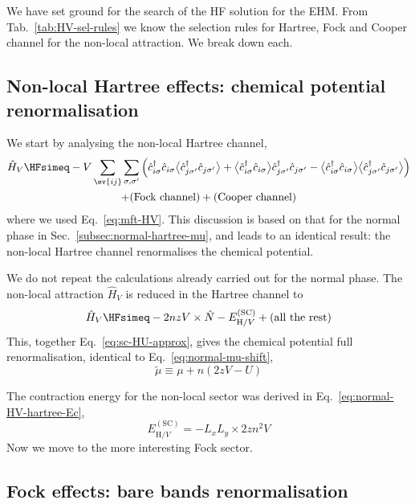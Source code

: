 We have set ground for the search of the HF solution for the EHM. From Tab.~\ref{tab:HV-sel-rules} we know the selection rules for Hartree, Fock and Cooper channel for the non-local attraction. We break down each.

\subsection{Non-local Hartree effects: chemical potential renormalisation}\label{subsec:sc-hartree-mu}

We start by analysing the non-local Hartree channel,
\begin{multline*}
	\hat H_V \HFsimeq -V \sum_{\ev{ij}} \sum_{\sigma,\sigma'} \Big(
	\hat c_{i\sigma}^\dagger \hat c_{i\sigma} \big\langle \hat c_{j\sigma'}^\dagger \hat c_{j\sigma'} \big\rangle + \big\langle \hat c_{i\sigma}^\dagger \hat c_{i\sigma} \big\rangle \hat c_{j\sigma'}^\dagger \hat c_{j\sigma'} - \big\langle \hat c_{i\sigma}^\dagger \hat c_{i\sigma} \big\rangle  \big\langle \hat c_{j\sigma'}^\dagger \hat c_{j\sigma'} \big\rangle \Big) \\
	+ (\text{Fock channel}) + (\text{Cooper channel})
\end{multline*}
where we used Eq.~\eqref{eq:mft-HV}. This discussion is based on that for the normal phase in Sec.~\ref{subsec:normal-hartree-mu}, and leads to an identical result: the non-local Hartree channel renormalises the chemical potential.

We do not repeat the calculations already carried out for the normal phase. The non-local attraction $\hat H_V$ is reduced in the Hartree channel to
\[
	\hat H_V \HFsimeq -2nzV \times \hat N - E_{\mathrm{H}/V}^{(\mathrm{SC})} + 
	(\text{all the rest})
\]
This, together Eq.~\eqref{eq:sc-HU-approx}, gives the chemical potential full renormalisation, identical to Eq.~\eqref{eq:normal-mu-shift},
\begin{equation}\label{eq:sc-mu-shift}
	\tilde{\mu} \equiv \mu + n(2zV-U)
\end{equation}

The contraction energy for the non-local sector was derived in Eq.~\eqref{eq:normal-HV-hartree-Ec},
\[
	E_{\mathrm{H}/V}^{(\mathrm{SC})} = - L_x L_y \times 2zn^2 V
\]
Now we move to the more interesting Fock sector.

\subsection{Fock effects: bare bands renormalisation}\label{subsec:sc-fock}

